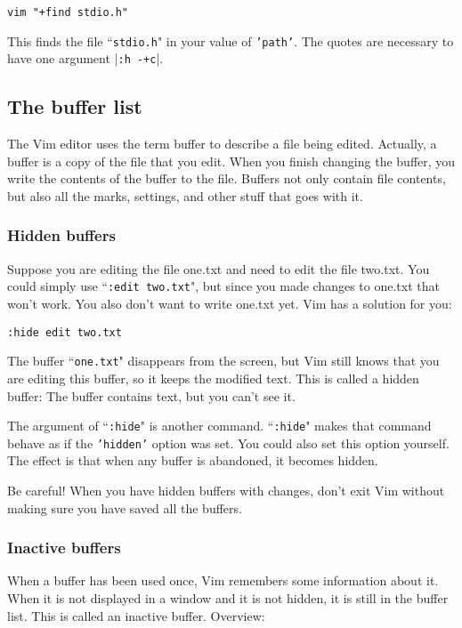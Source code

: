 \begin{Verbatim}[samepage=true]
 vim "+find stdio.h"
\end{Verbatim}

This finds the file ``\texttt{stdio.h}" in your value of \texttt{'path'}.
The quotes are necessary to have one argument |\texttt{:h -+c}|.
\subsection{The buffer list}
\label{The buffer list}
The Vim editor uses the term buffer to describe a file being edited.
Actually, a buffer is a copy of the file that you edit.
When you finish changing the buffer, you write the contents of the buffer to the file.
Buffers not only contain file contents, but also all the marks, settings, and other stuff that goes with it.
\subsubsection{Hidden buffers}
Suppose you are editing the file one.txt and need to edit the file two.txt.
You could simply use ``\texttt{:edit two.txt}", but since you made changes to one.txt that won't work.
You also don't want to write one.txt yet.
Vim has a solution for you:

\begin{Verbatim}[samepage=true]
 :hide edit two.txt
\end{Verbatim}

The buffer ``\texttt{one.txt}" disappears from the screen, but Vim still knows that you are editing this buffer, so it keeps the modified text.
This is called a hidden buffer: The buffer contains text, but you can't see it.

The argument of ``\texttt{:hide}" is another command.
``\texttt{:hide}" makes that command behave as if the \texttt{'hidden'} option was set.
You could also set this option yourself.
The effect is that when any buffer is abandoned, it becomes hidden.

Be careful!  When you have hidden buffers with changes, don't exit Vim without making sure you have saved all the buffers.
\subsubsection{Inactive buffers}
When a buffer has been used once, Vim remembers some information about it.
When it is not displayed in a window and it is not hidden, it is still in the buffer list.
This is called an inactive buffer.
Overview:

